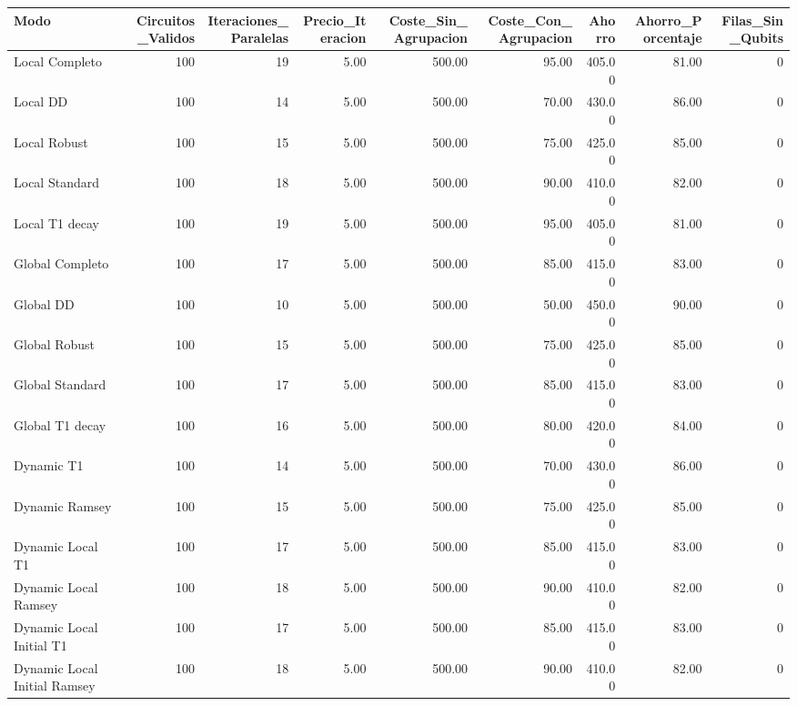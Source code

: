 \begin{tabular}{lrrrrrrrr}
\toprule
Modo & Circuitos_Validos & Iteraciones_Paralelas & Precio_Iteracion & Coste_Sin_Agrupacion & Coste_Con_Agrupacion & Ahorro & Ahorro_Porcentaje & Filas_Sin_Qubits \\
\midrule
Local Completo & 100 & 19 & 5.00 & 500.00 & 95.00 & 405.00 & 81.00 & 0 \\
Local DD & 100 & 14 & 5.00 & 500.00 & 70.00 & 430.00 & 86.00 & 0 \\
Local Robust & 100 & 15 & 5.00 & 500.00 & 75.00 & 425.00 & 85.00 & 0 \\
Local Standard & 100 & 18 & 5.00 & 500.00 & 90.00 & 410.00 & 82.00 & 0 \\
Local T1 decay & 100 & 19 & 5.00 & 500.00 & 95.00 & 405.00 & 81.00 & 0 \\
Global Completo & 100 & 17 & 5.00 & 500.00 & 85.00 & 415.00 & 83.00 & 0 \\
Global DD & 100 & 10 & 5.00 & 500.00 & 50.00 & 450.00 & 90.00 & 0 \\
Global Robust & 100 & 15 & 5.00 & 500.00 & 75.00 & 425.00 & 85.00 & 0 \\
Global Standard & 100 & 17 & 5.00 & 500.00 & 85.00 & 415.00 & 83.00 & 0 \\
Global T1 decay & 100 & 16 & 5.00 & 500.00 & 80.00 & 420.00 & 84.00 & 0 \\
Dynamic T1 & 100 & 14 & 5.00 & 500.00 & 70.00 & 430.00 & 86.00 & 0 \\
Dynamic Ramsey & 100 & 15 & 5.00 & 500.00 & 75.00 & 425.00 & 85.00 & 0 \\
Dynamic Local T1 & 100 & 17 & 5.00 & 500.00 & 85.00 & 415.00 & 83.00 & 0 \\
Dynamic Local Ramsey & 100 & 18 & 5.00 & 500.00 & 90.00 & 410.00 & 82.00 & 0 \\
Dynamic Local Initial T1 & 100 & 17 & 5.00 & 500.00 & 85.00 & 415.00 & 83.00 & 0 \\
Dynamic Local Initial Ramsey & 100 & 18 & 5.00 & 500.00 & 90.00 & 410.00 & 82.00 & 0 \\
\bottomrule
\end{tabular}
